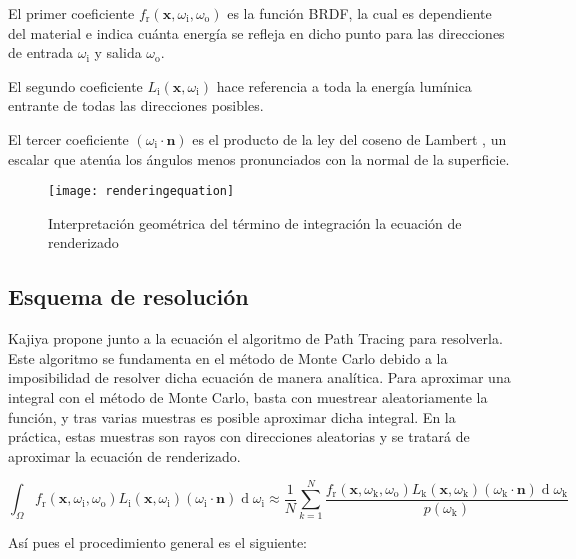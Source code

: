 El primer coeficiente $f_{\text{r}}(\mathbf {x} ,\omega _{\text{i}},\omega _{\text{o}})$ es la función BRDF, la cual es dependiente del material e indica cuánta energía se refleja en dicho punto para las direcciones de entrada $\omega _{\text{i}}$ y salida $\omega _{\text{o}}$.

El segundo coeficiente $L_{\text{i}}(\mathbf {x} ,\omega _{\text{i}})$ hace referencia a toda la energía lumínica entrante de todas las direcciones posibles.

El tercer coeficiente $(\omega _{\text{i}}\cdot \mathbf {n})$ es el producto de la ley del coseno de Lambert \cite{lambert1760jh}, un escalar que atenúa los ángulos menos pronunciados con la normal de la superficie.

\begin{figure}[H]
    \centering
	\texttt{[image: renderingequation]}
	\caption{Interpretación geométrica del término de integración la ecuación de renderizado}
	\label{fig:label}
\end{figure}


	\subsection{Esquema de resolución}
	\label{subsec:montecarlo}
Kajiya \cite{kajiya1986rendering} propone junto a la ecuación el algoritmo de Path Tracing para resolverla. Este algoritmo se fundamenta en el método de Monte Carlo debido a la imposibilidad de resolver dicha ecuación de manera analítica.
Para aproximar una integral con el método de Monte Carlo, basta con muestrear aleatoriamente la función, y tras varias muestras es posible aproximar dicha integral. En la práctica, estas muestras son rayos con direcciones aleatorias y se tratará de aproximar la ecuación de renderizado. 

\[
{\int _{\Omega }f_{\text{r}}(\mathbf {x} ,\omega _{\text{i}},\omega _{\text{o}})L_{\text{i}}(\mathbf {x} ,\omega _{\text{i}})(\omega _{\text{i}}\cdot \mathbf {n} )\operatorname {d} \omega _{\text{i}} \approx \displaystyle \frac{1}{N}\sum\limits_{k=1}^{N}\frac{f_{\text{r}}(\mathbf {x} ,\omega _{\text{k}},\omega _{\text{o}})L_{\text{k}}(\mathbf {x} ,\omega _{\text{k}})(\omega _{\text{k}}\cdot \mathbf {n} )\operatorname {d} \omega _{\text{k}}}{p(\omega _{\text{k}})}}
\]

Así pues el procedimiento general es el siguiente:

